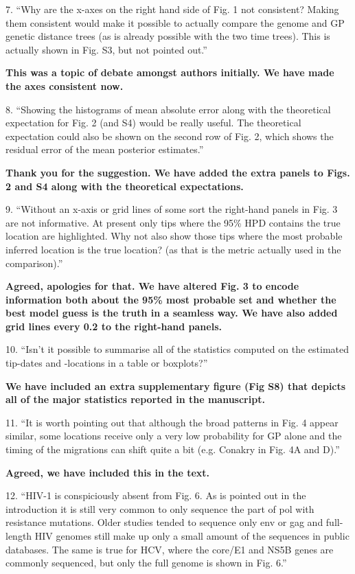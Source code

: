 \documentclass[11pt,oneside,letterpaper]{article}
\begin{document}
7. ``Why are the x-axes on the right hand side of Fig. 1 not consistent? Making them consistent would make it possible to actually compare the genome and GP genetic distance trees (as is already possible with the two time trees). This is actually shown in Fig. S3, but not pointed out.''

\textbf{This was a topic of debate amongst authors initially. We have made the axes consistent now.}

8. ``Showing the histograms of mean absolute error along with the theoretical expectation for Fig. 2 (and S4) would be really useful. The theoretical expectation could also be shown on the second row of Fig. 2, which shows the residual error of the mean posterior estimates.''

\textbf{Thank you for the suggestion. We have added the extra panels to Figs. 2 and S4 along with the theoretical expectations.}

9. ``Without an x-axis or grid lines of some sort the right-hand panels in Fig. 3 are not informative. At present only tips where the 95\% HPD contains the true location are highlighted. Why not also show those tips where the most probable inferred location is the true location? (as that is the metric actually used in the comparison).''

\textbf{Agreed, apologies for that. We have altered Fig. 3 to encode information both about the 95\% most probable set and whether the best model guess is the truth in a seamless way. We have also added grid lines every 0.2 to the right-hand panels.}

10. ``Isn't it possible to summarise all of the statistics computed on the estimated tip-dates and -locations in a table or boxplots?''

\textbf{We have included an extra supplementary figure (Fig S8) that depicts all of the major statistics reported in the manuscript.}

11. ``It is worth pointing out that although the broad patterns in Fig. 4 appear similar, some locations receive only a very low probability for GP alone and the timing of the migrations can shift quite a bit (e.g. Conakry in Fig. 4A and D).''

\textbf{Agreed, we have included this in the text.}

12. ``HIV-1 is conspiciously absent from Fig. 6. As is pointed out in the introduction it is still very common to only sequence the part of pol with resistance mutations. Older studies tended to sequence only env or gag and full-length HIV genomes still make up only a small amount of the sequences in public databases. The same is true for HCV, where the core/E1 and NS5B genes are commonly sequenced, but only the full genome is shown in Fig. 6.''
\end{document}
